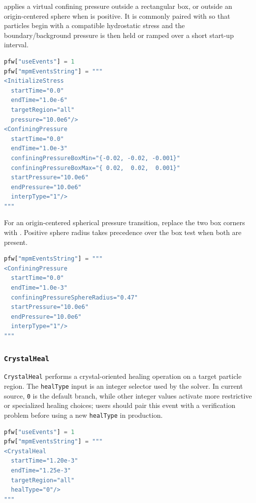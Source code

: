  applies a virtual confining pressure outside a rectangular box, or outside an origin-centered sphere when  is positive.  It is commonly paired with  so that particles begin with a compatible hydrostatic stress and the boundary/background pressure is then held or ramped over a short start-up interval.

\begin{lstlisting}[language=Python,caption={Confining-pressure event.}]
pfw["useEvents"] = 1
pfw["mpmEventsString"] = """
<InitializeStress
  startTime="0.0"
  endTime="1.0e-6"
  targetRegion="all"
  pressure="10.0e6"/>
<ConfiningPressure
  startTime="0.0"
  endTime="1.0e-3"
  confiningPressureBoxMin="{-0.02, -0.02, -0.001}"
  confiningPressureBoxMax="{ 0.02,  0.02,  0.001}"
  startPressure="10.0e6"
  endPressure="10.0e6"
  interpType="1"/>
"""
\end{lstlisting}

For an origin-centered spherical pressure transition, replace the two box
corners with .  Positive sphere radius
takes precedence over the box test when both are present.

\begin{lstlisting}[language=Python,caption={Spherical confining-pressure event.}]
pfw["mpmEventsString"] = """
<ConfiningPressure
  startTime="0.0"
  endTime="1.0e-3"
  confiningPressureSphereRadius="0.47"
  startPressure="10.0e6"
  endPressure="10.0e6"
  interpType="1"/>
"""
\end{lstlisting}

\subsubsection{\texttt{CrystalHeal}}

\texttt{CrystalHeal} performs a crystal-oriented healing operation on a target particle region.  The \texttt{healType} input is an integer selector used by the solver.  In current source, \texttt{0} is the default branch, while other integer values activate more restrictive or specialized healing choices; users should pair this event with a verification problem before using a new \texttt{healType} in production.

\begin{lstlisting}[language=Python,caption={Crystal-healing event.}]
pfw["useEvents"] = 1
pfw["mpmEventsString"] = """
<CrystalHeal
  startTime="1.20e-3"
  endTime="1.25e-3"
  targetRegion="all"
  healType="0"/>
"""
\end{lstlisting}

